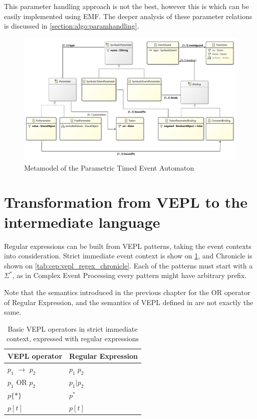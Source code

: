 This parameter handling approach is not the best, however this is which can be easily implemented using EMF.
The deeper analysis of these parameter relations is discussed in \cref{section:algo:paramhandling}.

\begin{figure}[h]
	\centering
	\includegraphics[width=\linewidth]{figures/chapter_5/Parameters_diagram}
	\caption{Metamodel of the Parametric Timed Event Automaton}
	\label{fig:algo:parametric_automaton}
\end{figure}

\section{Transformation from VEPL to the intermediate language}

Regular expressions can be built from VEPL patterns, taking the event contexts into consideration.
Strict immediate\citep{davidi} event context is show on \cref{tab:cep:vepl_regex_strict}, and Chronicle\citep{davidi} is shown on \cref{tab:cep:vepl_regex_chronicle}.
Each of the patterns must start with a $\Sigma^*$, as in Complex Event Processing every pattern might have arbitrary prefix.

Note that the semantics introduced in the previous chapter for the OR operator of Regular Expression, and the semantics of VEPL defined in\citep{davidi} are not exactly the same.

\begin{table}
	\caption{Basic VEPL operators in strict immediate context, expressed with regular expressions}		
	\label{tab:cep:vepl_regex_strict}
	\centering
	\begin{tabular}{@{}ll@{}}
		\toprule
		VEPL operator             & Regular Expression \\ \midrule
		$p_1$ $\rightarrow$ $p_2$ & $p_1\; p_2$        \\
		$p_1$ OR $p_2$            & $p_1|p_2$          \\
		$p\{\ast\}$               & $p^*$              \\
		$p[t]$                    & $p[t]$             \\ \bottomrule
	\end{tabular}
\end{table}

